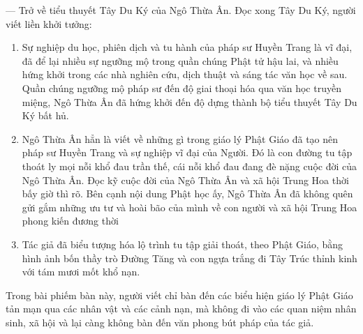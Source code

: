 — Trở về tiểu thuyết Tây Du Ký của Ngô Thừa Ân. Đọc xong Tây Du Ký, người viết liền khởi tưởng:

\begin{enumerate}[label=\itshape\alph*\upshape/]
   \item Sự nghiệp du học, phiên dịch và tu hành của pháp sư Huyền Trang là vĩ đại, đã để lại nhiều sự ngưỡng mộ trong quần chúng Phật tử hậu lai, và nhiều hứng khởi trong các nhà nghiên cứu, dịch thuật và sáng tác văn học về sau. Quần chúng ngưỡng mộ pháp sư đến độ giai thoại hóa qua văn học truyền miệng, Ngô Thừa Ân đã hứng khởi đến độ dựng thành bộ tiểu thuyết Tây Du Ký bất hủ.

   \item Ngô Thừa Ân hẳn là viết về những gì trong giáo lý Phật Giáo đã tạo nên pháp sư Huyền Trang và sự nghiệp vĩ đại của Người. Đó là con đường tu tập thoát ly mọi nỗi khổ đau trần thế, cái nỗi khổ đau đang đè nặng cuộc đời của Ngô Thừa Ân. Đọc kỹ cuộc đời của Ngô Thừa Ân và xã hội Trung Hoa thời bấy giờ thì rõ. Bên cạnh nội dung Phật học ấy, Ngô Thừa Ân đã không quên gửi gắm những ưu tư và hoài bão của mình về con người và xã hội Trung Hoa phong kiến đương thời

   \item Tác giả đã biểu tượng hóa lộ trình tu tập giải thoát, theo Phật Giáo, bằng hình ảnh bốn thầy trò Đường Tăng và con ngựa trắng đi Tây Trúc thỉnh kinh với tám mươi mốt khổ nạn.
\end{enumerate}

Trong bài phiếm bàn này, người viết chỉ bàn đến các biểu hiện giáo lý Phật Giáo tản mạn qua các nhân vật và các cảnh nạn, mà không đi vào các quan niệm nhân sinh, xã hội và lại càng không bàn đến văn phong bút pháp của tác giả.

